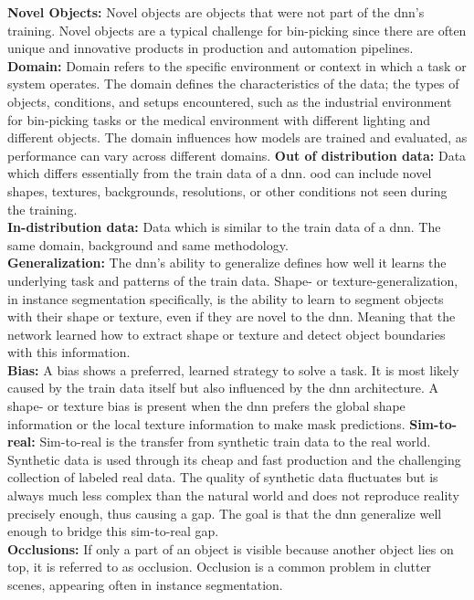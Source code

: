 		\textbf{Novel Objects:} Novel objects are objects that were not part of the \ac{dnn}'s training. Novel objects are a typical challenge for bin-picking since there are often unique and innovative products in production and automation pipelines.\\
		\textbf{Domain:} Domain refers to the specific environment or context in which a task or system operates. The domain defines the characteristics of the data; the types of objects, conditions, and setups encountered, such as the industrial environment for bin-picking tasks or the medical environment with different lighting and different objects. The domain influences how models are trained and evaluated, as performance can vary across different domains.
		\textbf{Out of distribution data:} Data which differs essentially from the train data of a \ac{dnn}. \acl{ood} can include novel shapes, textures, backgrounds, resolutions, or other conditions not seen during the training.\\
		\textbf{In-distribution data:} Data which is similar to the train data of a \ac{dnn}. The same domain, background and same methodology.\\
		\textbf{Generalization:} The \ac{dnn}'s ability to generalize defines how well it learns the underlying task and patterns of the train data. Shape- or texture-generalization, in instance segmentation specifically, is the ability to learn to segment objects with their shape or texture, even if they are novel to the \ac{dnn}. Meaning that the network learned how to extract shape or texture and detect object boundaries with this information. \\
		\textbf{Bias:} A bias shows a preferred, learned strategy to solve a task. It is most likely caused by the train data itself but also influenced by the \ac{dnn} architecture. A shape- or texture bias is present when the \ac{dnn} prefers the global shape information or the local texture information to make mask predictions.
		\clearpage
		\textbf{Sim-to-real:} Sim-to-real is the transfer from synthetic train data to the real world. Synthetic data is used through its cheap and fast production and the challenging collection of labeled real data. The quality of synthetic data fluctuates but is always much less complex than the natural world and does not reproduce reality precisely enough, thus causing a gap. The goal is that the \ac{dnn} generalize well enough to bridge this sim-to-real gap.\\
		\textbf{Occlusions:} If only a part of an object is visible because another object lies on top, it is referred to as occlusion. Occlusion is a common problem in clutter scenes, appearing often in instance segmentation.
		
